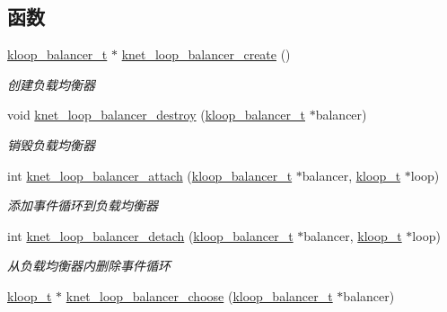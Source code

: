 \subsection*{函数}
\begin{DoxyCompactItemize}
\item 
\hyperlink{a00054_abd3f964265beb2f8984e76f44fb5ea33_abd3f964265beb2f8984e76f44fb5ea33}{kloop\+\_\+balancer\+\_\+t} $\ast$ \hyperlink{a00114_ga4211b2d32e1a7447e479b9727dce61d4_ga4211b2d32e1a7447e479b9727dce61d4}{knet\+\_\+loop\+\_\+balancer\+\_\+create} ()
\begin{DoxyCompactList}\small\item\em 创建负载均衡器 \end{DoxyCompactList}\item 
void \hyperlink{a00114_ga6fcdd378027b0705cd2e279601985609_ga6fcdd378027b0705cd2e279601985609}{knet\+\_\+loop\+\_\+balancer\+\_\+destroy} (\hyperlink{a00054_abd3f964265beb2f8984e76f44fb5ea33_abd3f964265beb2f8984e76f44fb5ea33}{kloop\+\_\+balancer\+\_\+t} $\ast$balancer)
\begin{DoxyCompactList}\small\item\em 销毁负载均衡器 \end{DoxyCompactList}\item 
int \hyperlink{a00114_ga647f8a2d39c97c8759f8768ebc612b98_ga647f8a2d39c97c8759f8768ebc612b98}{knet\+\_\+loop\+\_\+balancer\+\_\+attach} (\hyperlink{a00054_abd3f964265beb2f8984e76f44fb5ea33_abd3f964265beb2f8984e76f44fb5ea33}{kloop\+\_\+balancer\+\_\+t} $\ast$balancer, \hyperlink{a00054_a97fc76209a58362019f1ded9169e397f_a97fc76209a58362019f1ded9169e397f}{kloop\+\_\+t} $\ast$loop)
\begin{DoxyCompactList}\small\item\em 添加事件循环到负载均衡器 \end{DoxyCompactList}\item 
int \hyperlink{a00114_ga705fd81a537d18cfe1b66df9d15b6c4e_ga705fd81a537d18cfe1b66df9d15b6c4e}{knet\+\_\+loop\+\_\+balancer\+\_\+detach} (\hyperlink{a00054_abd3f964265beb2f8984e76f44fb5ea33_abd3f964265beb2f8984e76f44fb5ea33}{kloop\+\_\+balancer\+\_\+t} $\ast$balancer, \hyperlink{a00054_a97fc76209a58362019f1ded9169e397f_a97fc76209a58362019f1ded9169e397f}{kloop\+\_\+t} $\ast$loop)
\begin{DoxyCompactList}\small\item\em 从负载均衡器内删除事件循环 \end{DoxyCompactList}\item 
\hyperlink{a00054_a97fc76209a58362019f1ded9169e397f_a97fc76209a58362019f1ded9169e397f}{kloop\+\_\+t} $\ast$ \hyperlink{a00077_ab16d1483a612eba09677784480b5e1e7_ab16d1483a612eba09677784480b5e1e7}{knet\+\_\+loop\+\_\+balancer\+\_\+choose} (\hyperlink{a00054_abd3f964265beb2f8984e76f44fb5ea33_abd3f964265beb2f8984e76f44fb5ea33}{kloop\+\_\+balancer\+\_\+t} $\ast$balancer)

\end{DoxyCompactItemize}
